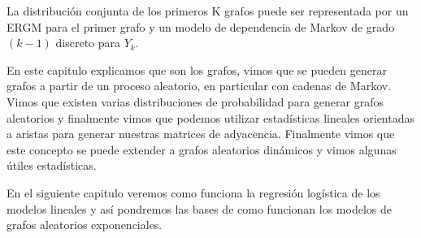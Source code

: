 La distribución conjunta de los primeros K grafos puede ser representada por un ERGM para el primer grafo y un modelo de dependencia de Markov de grado $(k-1)$ discreto para $Y_k$. 

En este capitulo explicamos que son los grafos, vimos que se pueden generar grafos a partir de un proceso aleatorio, en particular con cadenas de Markov. Vimos que existen varias distribuciones de probabilidad para generar grafos aleatorios y finalmente vimos que podemos utilizar estadísticas lineales orientadas a aristas para generar nuestras matrices de adyacencia. Finalmente vimos que este concepto se puede extender a grafos aleatorios dinámicos y vimos algunas útiles estadísticas.

En el siguiente capitulo veremos como funciona la regresión logística de los modelos lineales y así pondremos las bases de como funcionan los modelos de grafos aleatorios exponenciales.
